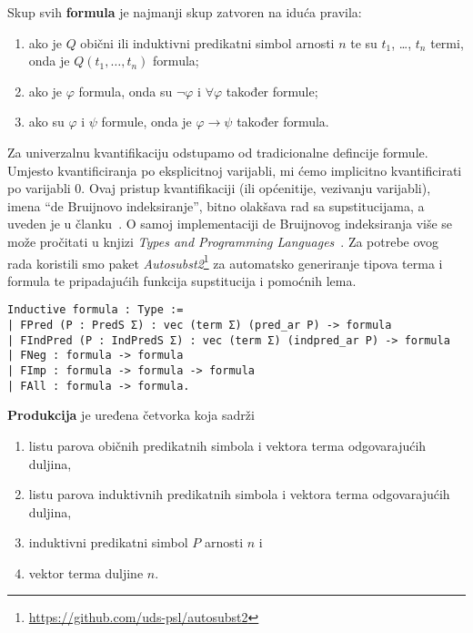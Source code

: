 \begin{definition}\label{def:formula}
  Skup svih \textbf{formula} je najmanji skup zatvoren na iduća pravila:
  \begin{enumerate}
  \item ako je \(Q\) obični ili induktivni predikatni simbol arnosti \(n\) te su \(t_{1}\), \ldots, \(t_{n}\) termi,
    onda je \(Q(t_{1}, \ldots, t_{n})\) formula;
  \item ako je \(\varphi\) formula, onda su \(\neg\varphi\) i \(\forall\varphi\) također formule;
  \item ako su \(\varphi\) i \(\psi\) formule, onda je \(\varphi \rightarrow \psi\) također formula.
  \end{enumerate}
\end{definition}
\noindent Za univerzalnu kvantifikaciju odstupamo od tradicionalne defincije formule.
Umjesto kvantificiranja po eksplicitnoj varijabli,
mi ćemo implicitno kvantificirati po varijabli \(0\).
Ovaj pristup kvantifikaciji (ili općenitije, vezivanju varijabli), imena ``de Bruijnovo indeksiranje'', bitno olakšava rad sa supstitucijama, a uveden je u članku~\cite{debruijnamelessdummies}.
O samoj implementaciji de Bruijnovog indeksiranja više se može pročitati u knjizi
\textit{Types and Programming Languages}~\cite{pierce2002tapl}.
Za potrebe ovog rada koristili smo paket \textit{Autosubst2}\footnote{\url{https://github.com/uds-psl/autosubst2}} za automatsko generiranje tipova terma i formula te
pripadajućih funkcija supstitucija i pomoćnih lema.
\begin{verbatim}
Inductive formula : Type :=
| FPred (P : PredS Σ) : vec (term Σ) (pred_ar P) -> formula 
| FIndPred (P : IndPredS Σ) : vec (term Σ) (indpred_ar P) -> formula 
| FNeg : formula -> formula 
| FImp : formula -> formula -> formula 
| FAll : formula -> formula.
\end{verbatim}

\begin{definition}
  \textbf{Produkcija} je uređena četvorka koja sadrži
  \begin{enumerate}
  \item listu parova običnih predikatnih simbola i vektora terma odgovarajućih duljina,
  \item listu parova induktivnih predikatnih simbola i vektora terma odgovarajućih duljina,
  \item induktivni predikatni simbol \(P\) arnosti \(n\) i
  \item vektor terma duljine \(n\).
  \end{enumerate}
\end{definition}

